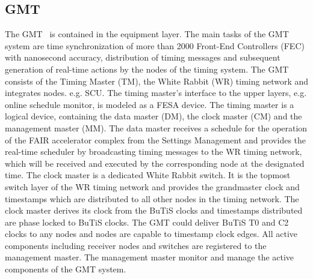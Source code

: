 \subsection{GMT}
The GMT~\cite{beck_new_2012} is contained in the equipment layer. The main tasks of the GMT system are time synchronization of more than 2000 Front-End Controllers (\gls{FEC}) with nanosecond accuracy, distribution of timing messages and subsequent generation of real-time actions by the nodes of the timing system. The GMT consists of the Timing Master (\gls{TM}), the White Rabbit (WR) timing network and integrates nodes. e.g. SCU. The timing master's interface to the upper layers, e.g. online schedule monitor, is modeled as a FESA device. The timing master is a logical device, containing the data master (\gls{DM}), the clock master (\gls{CM}) and the management master (\gls{MM}). The data master receives a schedule for the operation of the FAIR accelerator complex from the Settings Management and provides the real-time scheduler by broadcasting timing messages to the WR timing network, which will be received and executed by the corresponding node at the designated time. The clock master is a dedicated White Rabbit switch. It is the topmost switch layer of the WR timing network and provides the grandmaster clock and timestamps which are distributed to all other nodes in the timing network. The clock master derives its clock from the BuTiS clocks and timestamps distributed are phase locked to BuTiS clocks. The GMT could deliver BuTiS T0 and C2 clocks to any nodes and nodes are capable to timestamp clock edges. All active components including receiver nodes and switches are registered to the management master. The management master monitor and manage the active components of the GMT system.

